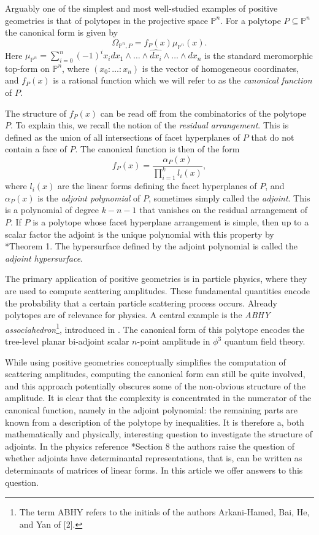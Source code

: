 \documentclass[a4paper,10pt]{amsart}
\theoremstyle{definition}
\theoremstyle{plain}
\begin{document}
Arguably one of the simplest and most well-studied examples of positive geometries is that of polytopes in the projective space $\mathbb{P}^n$. For a polytope $P\subseteq \mathbb{P}^n$ the canonical form is given by 
$$\Omega_{\mathbb{P}^n, P} = f_P(x) \mu_{\mathbb{P}^n}(x).$$
Here $\mu_{\mathbb{P}^n} = \sum_{i=0}^n (-1)^{i}x_i dx_1\wedge\ldots\wedge \widehat{dx_i} \wedge\ldots\wedge dx_n$ is the standard meromorphic top-form on $\mathbb{P}^n$, where $(x_0:\ldots:x_n)$ is the vector of homogeneous coordinates, and $f_P(x)$ is a rational function which we will refer to as the \emph{canonical function} of $P$. 

The structure of $f_P(x)$ can be read off from the combinatorics of the polytope $P$. To explain this, we recall the notion of the \emph{residual arrangement}. This is defined as the union of all intersections of facet hyperplanes of $P$ that do not contain a face of $P$. The canonical function is then of the form 
$$f_P(x) = \dfrac{\alpha_P(x)}{\prod_{i=1}^k l_i(x)},$$
where $l_i(x)$ are the linear forms defining the facet hyperplanes of $P$, and $\alpha_P(x)$ is the \emph{adjoint polynomial} of $P$, sometimes simply called the \emph{adjoint}. This is a polynomial of degree $k-n-1$ that vanishes on the residual arrangement of $P$. If $P$ is a polytope whose facet hyperplane arrangement is simple, then up to a scalar factor the adjoint is the unique polynomial with this property by \cite{KohnRanestad2019AdjCurves}*{Theorem 1}. The hypersurface defined by the adjoint polynomial is called the \emph{adjoint hypersurface}. 

The primary application of positive geometries is in particle physics, where they are used to compute scattering amplitudes. These fundamental quantities encode the probability that a certain particle scattering process occurs. Already polytopes are of relevance for physics. A central example is the \emph{ABHY associahedron}\footnote{The term ABHY refers to the initials of the authors Arkani-Hamed, Bai, He, and Yan of [2].}, introduced in \cite{arkani2018scattering}. The canonical form of this polytope encodes the tree-level planar bi-adjoint scalar $n$-point amplitude in $\phi^3$ quantum field theory.

While using positive geometries conceptually simplifies the computation of scattering amplitudes, computing the canonical form can still be quite involved, and this approach potentially obscures some of the non-obvious structure of the amplitude. It is clear that the complexity is concentrated in the numerator of the canonical function, namely in the adjoint polynomial: the remaining parts are known from a description of the polytope by inequalities. It is therefore a, both mathematically and physically, interesting question to investigate the structure of adjoints. 
In the physics reference \cite{arkani2024hidden}*{Section 8} the authors raise the question of whether adjoints have determinantal representations, that is, can be written as determinants of matrices of linear forms. In this article we offer answers to this question. 
\end{document}
